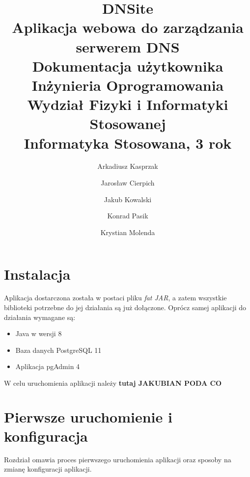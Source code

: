 \documentclass[12pt] {article}
\title 
{	
	{
		\textbf{\textsf{\Huge\color{orange}DNS\color{white}ite}} \\ [0.1in]
		\normalfont\sffamily\LARGE\color{white}
		Aplikacja webowa do zarządzania serwerem DNS \\[0.1in]
		Dokumentacja użytkownika\\ [0.1in]
		\large 
		Inżynieria Oprogramowania \\
		Wydział Fizyki i Informatyki Stosowanej \\
		Informatyka Stosowana, 3 rok \\
	}
}
\author 
{
	\color{white}\normalfont\sffamily Arkadiusz Kasprzak \and 
	\color{white}\normalfont\sffamily Jarosław Cierpich \and 
	\color{white}\normalfont\sffamily Jakub Kowalski \and 
	\color{white}\normalfont\sffamily Konrad Pasik \and 
	\color{white}\normalfont\sffamily Krystian Molenda
}
\date{}
\begin{document}
\pagecolor{backgroundColor}
\maketitle


\newpage
\pagecolor{white}

\tableofcontents

\newpage 

\section{Instalacja}
Aplikacja dostarczona została w postaci pliku \emph{fat JAR}, a zatem wszystkie biblioteki potrzebne do jej działania są już dołączone. Oprócz samej aplikacji do działania wymagane są:
\begin{itemize}
\item Java w wersji 8
\item Baza danych PostgreSQL 11
\item Aplikacja pgAdmin 4
\end{itemize}
W celu uruchomienia aplikacji należy \textbf{tutaj JAKUBIAN PODA CO}


\section{Pierwsze uruchomienie i konfiguracja}
Rozdział omawia proces pierwszego uruchomienia aplikacji oraz sposoby na zmianę konfiguracji aplikacji.
\end{document}
